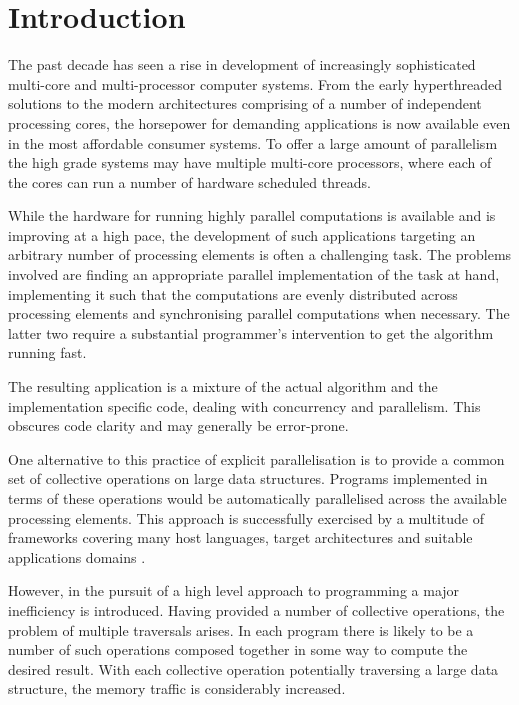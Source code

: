\documentclass[preamble.tex]{subfiles}
\begin{document}
\clearpage

\chapter{Introduction}
\label{ch:introduction}

The past decade has seen a rise in development of increasingly sophisticated multi-core and multi-processor computer systems. From the early hyperthreaded solutions to the modern architectures comprising of a number of independent processing cores, the horsepower for demanding applications is now available even in the most affordable consumer systems. To offer a large amount of parallelism the high grade systems may have multiple multi-core processors, where each of the cores can run a number of hardware scheduled threads.

While the hardware for running highly parallel computations is available and is improving at a high pace, the development of such applications targeting an arbitrary number of processing elements is often a challenging task. The problems involved are finding an appropriate parallel implementation of the task at hand, implementing it such that the computations are evenly distributed across processing elements and synchronising parallel computations when necessary. The latter two require a substantial programmer's intervention to get the algorithm running fast.


The resulting application is a mixture of the actual algorithm and the implementation specific code, dealing with concurrency and parallelism. This obscures code clarity and may generally be error-prone.

One alternative to this practice of explicit parallelisation is to provide a common set of collective operations\icollop{} on large data structures. Programs implemented in terms of these operations would be automatically parallelised across the available processing elements. This approach is successfully exercised by a multitude of frameworks covering many host languages, target architectures and suitable applications domains \cite{PLKC08,KCL+10,CKL+11,AS07}.

However, in the pursuit of a high level approach to programming a major inefficiency is introduced. Having provided a number of collective operations, the problem of multiple traversals arises. In each program there is likely to be a number of such operations composed together in some way to compute the desired result. With each collective operation potentially traversing a large data structure, the memory traffic is considerably increased.
\end{document}

